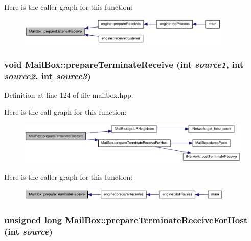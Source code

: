 Here is the caller graph for this function:\nopagebreak
\begin{figure}[H]
\begin{center}
\leavevmode
\includegraphics[width=288pt]{class_mail_box_aa9c92ef9ed35dbd1ebc4aae5f16876bd_icgraph}
\end{center}
\end{figure}
\hypertarget{class_mail_box_a9730cc56fbce0325496bb67970572015}{
\subsubsection[{prepareTerminateReceive}]{\setlength{\rightskip}{0pt plus 5cm}void MailBox::prepareTerminateReceive (int {\em source1}, \/  int {\em source2}, \/  int {\em source3})}}
\label{class_mail_box_a9730cc56fbce0325496bb67970572015}


Definition at line 124 of file mailbox.hpp.

Here is the call graph for this function:\nopagebreak
\begin{figure}[H]
\begin{center}
\leavevmode
\includegraphics[width=327pt]{class_mail_box_a9730cc56fbce0325496bb67970572015_cgraph}
\end{center}
\end{figure}


Here is the caller graph for this function:\nopagebreak
\begin{figure}[H]
\begin{center}
\leavevmode
\includegraphics[width=292pt]{class_mail_box_a9730cc56fbce0325496bb67970572015_icgraph}
\end{center}
\end{figure}
\hypertarget{class_mail_box_a45435c4ffb07fe13da0bcdacdde49bb6}{
\subsubsection[{prepareTerminateReceiveForHost}]{\setlength{\rightskip}{0pt plus 5cm}unsigned long MailBox::prepareTerminateReceiveForHost (int {\em source})}}
\label{class_mail_box_a45435c4ffb07fe13da0bcdacdde49bb6}


